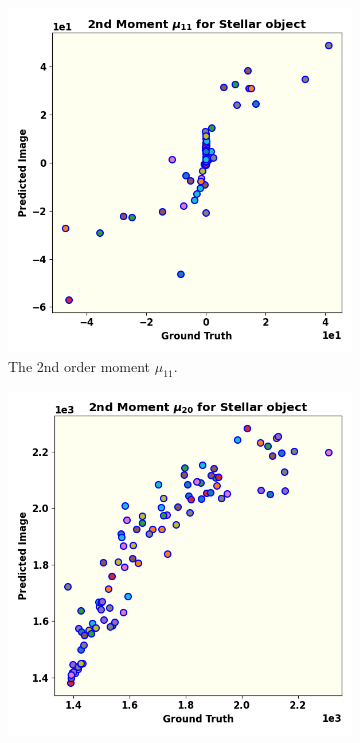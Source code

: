\documentclass[fleqn,usenatbib,twocolumn]{mnras}
\begin{document}
\begin{figure}
	\centering
	\begin{subfigure}{0.33\linewidth}
		\includegraphics[width=\linewidth]{fig/moments/mom3.png}
		\caption{The 2nd order moment $\mu_{11}$.}
		\label{fig:mom4}
	\end{subfigure}\hfill
	\begin{subfigure}{0.33\linewidth}
		\includegraphics[width=\linewidth]{fig/moments/mom4.png}

\end{subfigure}
\end{figure}
\end{document}
